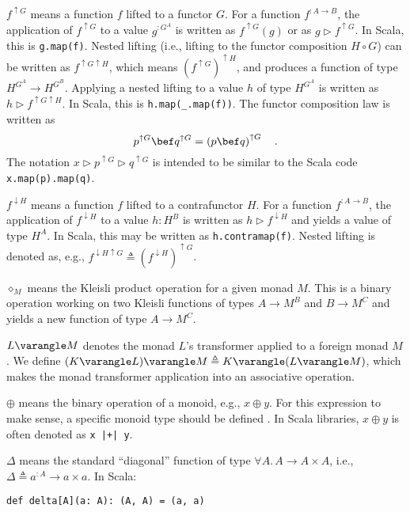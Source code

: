 $f^{\uparrow G}$ means a function $f$ lifted to a functor $G$.
For a function $f^{:A\rightarrow B}$, the application of $f^{\uparrow G}$
to a value $g^{:G^{A}}$ is written as $f^{\uparrow G}(g)$ or as
$g\triangleright f^{\uparrow G}$. In Scala, this is \lstinline!g.map(f)!.
Nested lifting (i.e., lifting to the functor composition $H\circ G$)
can be written as $f^{\uparrow G\uparrow H}$, which means $\left(f^{\uparrow G}\right)^{\uparrow H}$,
and produces a function of type $H^{G^{A}}\rightarrow H^{G^{B}}$.
Applying a nested lifting to a value $h$ of type $H^{G^{A}}$ is
written as $h\triangleright f^{\uparrow G\uparrow H}$. In Scala,
this is \lstinline!h.map(_.map(f))!. The functor composition law
is written as
\[
p^{\uparrow G}\bef q^{\uparrow G}=\left(p\bef q\right)^{\uparrow G}\quad.
\]
The notation $x\triangleright p^{\uparrow G}\triangleright q^{\uparrow G}$
is intended to be similar to the Scala code \lstinline!x.map(p).map(q)!.

$f^{\downarrow H}$ means a function $f$ lifted to a contrafunctor
$H$. For a function $f^{:A\rightarrow B}$, the application of $f^{\downarrow H}$
to a value $h:H^{B}$ is written as $h\triangleright f^{\downarrow H}$
and yields a value of type $H^{A}$. In Scala, this may be written
as \lstinline!h.contramap(f)!. Nested lifting is denoted as, e.g.,
$f^{\downarrow H\uparrow G}\triangleq(f^{\downarrow H})^{\uparrow G}$.

$\diamond_{M}$ means the Kleisli product operation for a given monad
$M$. This is a binary operation working on two Kleisli functions
of types $A\rightarrow M^{B}$ and $B\rightarrow M^{C}$ and yields
a new function of type $A\rightarrow M^{C}$.

$L\varangle M$ denotes the monad $L$\textsf{'}s transformer applied to a
foreign monad $M$. We define $(K\varangle L)\varangle M\triangleq K\varangle(L\varangle M)$,
which makes the monad transformer application into an associative
operation.

$\oplus$ means the binary operation of a monoid, e.g., $x\oplus y$.
For this expression to make sense, a specific monoid type should be
defined . In Scala libraries, $x\oplus y$ is often denoted as \lstinline!x |+| y!.

$\Delta$ means the standard \textsf{``}diagonal\textsf{''} function of type $\forall A.\,A\rightarrow A\times A$,
i.e., $\Delta\triangleq a^{:A}\rightarrow a\times a$. In Scala:
\begin{lstlisting}
def delta[A](a: A): (A, A) = (a, a)
\end{lstlisting}

